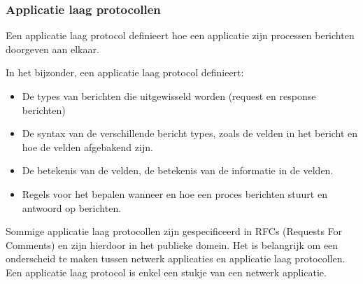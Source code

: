 \subsubsection{Applicatie laag protocollen}

\noindent Een applicatie laag protocol definieert hoe een applicatie zijn processen berichten doorgeven aan elkaar. 

\noindent In het bijzonder, een applicatie laag protocol definieert:
\begin{itemize}
    \item De types van berichten die uitgewisseld worden (request en response berichten)
    \item De syntax van de verschillende bericht types, zoals de velden in het bericht en hoe de velden afgebakend zijn.
    \item De betekenis van de velden, de betekenis van de informatie in de velden.
    \item Regels voor het bepalen wanneer en hoe een proces berichten stuurt en antwoord op berichten.
\end{itemize}

\noindent Sommige applicatie laag protocollen zijn gespecificeerd in RFCs (Requests For Comments) en zijn hierdoor in het publieke domein. Het is belangrijk om een onderscheid te maken tussen netwerk applicaties en applicatie laag protocollen. Een applicatie laag protocol is enkel een stukje van een netwerk applicatie.
